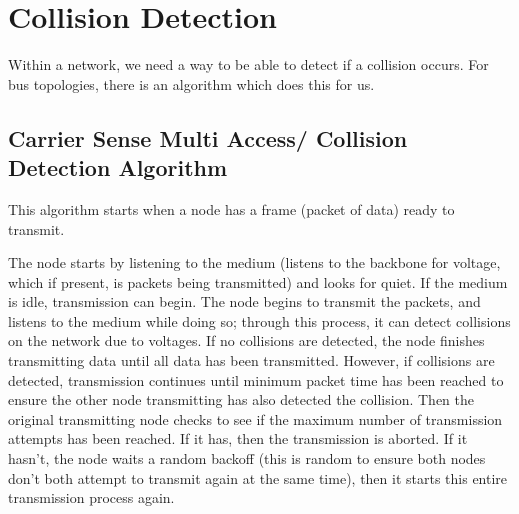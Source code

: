 
\section*{Collision Detection}
Within a network, we need a way to be able to detect if a collision occurs. For bus topologies, there is an algorithm which does this for us.
\subsection*{Carrier Sense Multi Access/ Collision Detection Algorithm}
This algorithm starts when a node has a frame (packet of data) ready to transmit.

The node starts by listening to the medium (listens to the backbone for voltage, which if present, is packets being transmitted) and looks for quiet. If the medium is idle, transmission can begin. The node begins to transmit the packets, and listens to the medium while doing so; through this process, it can detect collisions on the network due to voltages. If no collisions are detected, the node finishes transmitting data until all data has been transmitted. However, if collisions are detected, transmission continues until minimum packet time has been reached to ensure the other node transmitting has also detected the collision. Then the original transmitting node checks to see if the maximum number of transmission attempts has been reached. If it has, then the transmission is aborted. If it hasn't, the node waits a random backoff (this is random to ensure both nodes don't both attempt to transmit again at the same time), then it starts this entire transmission process again.